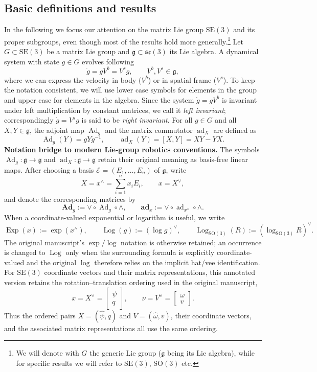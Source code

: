 \documentclass[11pt]{article}
\newenvironment{revision}{\color{red}}{}
\newcommand{\bAd}{\mathbf{Ad}}
\newcommand{\bad}{\mathbf{ad}}
\newcommand{\Exp}{\operatorname{Exp}}
\newcommand{\Log}{\operatorname{Log}}
\newcommand{\SO}{\mathrm{SO}}
\newcommand{\SE}{\mathrm{SE}}
\newcommand{\se}{\mathfrak{se}}
\newcommand{\gfrak}{\mathfrak g}
\newcommand{\Ad}{\operatorname{Ad}}
\newcommand{\ad}{\operatorname{ad}}
\begin{document}
\subsection{Basic definitions and results}\label{subsec:basic-definitions}
In the following we focus our attention on the matrix Lie group $\SE(3)$ and its proper subgroups, even though most of the results hold more generally.\footnote{We will denote with $G$ the generic Lie group ($\gfrak$ being its Lie algebra), while for specific results we will refer to $\SE(3)$, $\SO(3)$ etc.} Let $G\subset\SE(3)$ be a matrix Lie group and $\gfrak\subset\se(3)$ its Lie algebra. A dynamical system with state $g\in G$ evolves following
\begin{equation*}
\dot g=gV^b=V^s g,\qquad V^b,V^s\in\gfrak,\tag{2.1}\label{eq:2.1}
\end{equation*}
where we can express the velocity in body ($V^b$) or in spatial frame ($V^s$). To keep the notation consistent, we will use lower case symbols for elements in the group and upper case for elements in the algebra. Since the system $\dot g=gV^b$ is invariant under left multiplication by constant matrices, we call it \emph{left invariant}; correspondingly $\dot g=V^s g$ is said to be \emph{right invariant}. For all $g\in G$ and all $X,Y\in\gfrak$, the adjoint map $\Ad_g$ and the matrix commutator $\ad_X$ are defined as
\begin{equation*}
\Ad_g(Y)=gYg^{-1},\qquad \ad_X(Y)=[X,Y]=XY-YX.
\end{equation*}
\begin{revision}
\noindent\textbf{Notation bridge to modern Lie-group robotics conventions.}
The symbols $\Ad_g:\gfrak\to\gfrak$ and $\ad_X:\gfrak\to\gfrak$ retain their original
meaning as basis-free linear maps.  After choosing a basis $\mathcal E=(E_1,\ldots,E_n)$ of
$\gfrak$, write
\[
X=x^\wedge=\sum_{i=1}^n x_iE_i,\qquad x=X^\vee,
\]
and denote the corresponding matrices by
\[
\bAd_g:=\vee\circ\Ad_g\circ\wedge,\qquad
\bad_x:=\vee\circ\ad_{x^\wedge}\circ\wedge.
\]
When a coordinate-valued exponential or logarithm is useful, we write
\[
\Exp(x):=\exp(x^\wedge),\qquad \Log(g):=(\log g)^\vee,
\qquad
\Log_{\SO(3)}(R):=(\log_{\SO(3)}R)^\vee.
\]
The original manuscript's $\exp/\log$ notation is otherwise retained; an occurrence is
changed to $\Log$ only when the surrounding formula is explicitly coordinate-valued and the
original $\log$ therefore relies on the implicit hat/vee identification.  For $\SE(3)$ coordinate vectors and their matrix representations, this annotated version
retains the rotation--translation ordering used in the original manuscript,
\[
x=X^\vee=\begin{bmatrix}\psi\\q\end{bmatrix},\qquad
\nu=V^\vee=\begin{bmatrix}\omega\\v\end{bmatrix}.
\]
Thus the ordered pairs $X=(\widehat\psi,q)$ and $V=(\widehat\omega,v)$, their coordinate
vectors, and the associated matrix representations all use the same ordering.
\end{revision}
\end{document}
